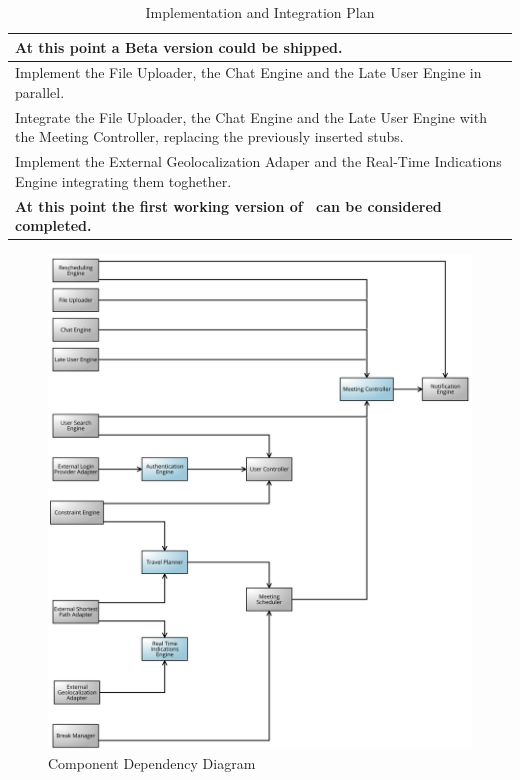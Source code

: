 \begin{longtable}{|m{16cm}|}
	\\ \hline
	\textbf{At this point a Beta version could be shipped.}
	\\ \hline Implement the File Uploader, the Chat Engine and the Late User Engine in parallel.
	\\ \hline Integrate the File Uploader, the Chat Engine and the Late User Engine with the Meeting Controller, replacing the previously inserted stubs.
	\\ \hline Implement the External Geolocalization Adaper and the Real-Time Indications Engine integrating them toghether.
	\\ \hline
	\textbf{At this point the first working version of \projectname~can be considered completed.} \hline
	\caption{Implementation and Integration Plan}
\end{longtable}

\begin{figure}[!h]
	\centering\includegraphics[scale = 0.19]{Images/UMLDiagrams/DependencyDiagramColored.png}
	\caption{Component Dependency Diagram}
\end{figure}

\clearpage